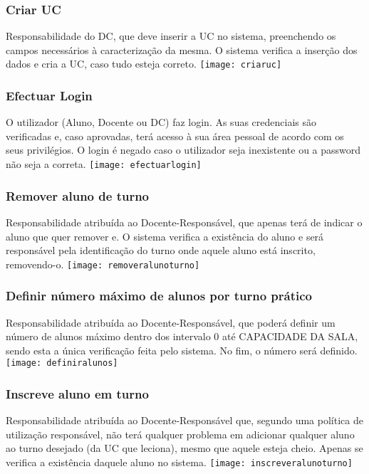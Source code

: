 \documentclass[a4paper]{article}
\begin{document}
\subsubsection{Criar UC}
Responsabilidade do DC, que deve inserir a UC no sistema, preenchendo os campos necessários à caracterização da mesma. O sistema verifica a inserção dos dados e cria a UC, caso tudo esteja correto.
\texttt{[image: criaruc]}\break

\subsubsection{Efectuar Login}
O utilizador (Aluno, Docente ou DC) faz login. As suas credenciais são verificadas e, caso aprovadas, terá acesso à sua área pessoal de acordo com os seus privilégios. O login é negado caso o utilizador seja inexistente ou a password não seja a correta.
\texttt{[image: efectuarlogin]}\break

\subsubsection{Remover aluno de turno}
Responsabilidade atribuída ao Docente-Responsável, que apenas terá de indicar o aluno que quer remover e. O sistema verifica a existência do aluno e será responsável pela identificação do turno onde aquele aluno está inscrito, removendo-o.
\texttt{[image: removeralunoturno]}\break

\subsubsection{Definir número máximo de alunos por turno prático}
Responsabilidade atribuída ao Docente-Responsável, que poderá definir um número de alunos máximo dentro dos intervalo 0 até CAPACIDADE DA SALA, sendo esta a única verificação feita pelo sistema. No fim, o número será definido.
\texttt{[image: definiralunos]}\break

\subsubsection{Inscreve aluno em turno}
Responsabilidade atribuída ao Docente-Responsável que, segundo uma política de utilização responsável, não terá qualquer problema em adicionar qualquer aluno ao turno desejado (da UC que leciona), mesmo que aquele esteja cheio. Apenas se verifica a existência daquele aluno no sistema.
\texttt{[image: inscreveralunoturno]}\break
\end{document}
